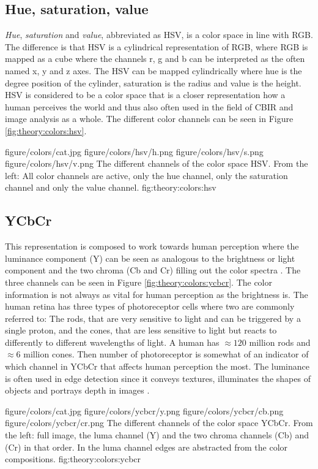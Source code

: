 \subsection{Hue, saturation, value}
\label{sec:HSV_theory}
\emph{Hue}, \emph{saturation} and \emph{value}, abbreviated as HSV, is a color space in line with RGB. The difference is that HSV is a cylindrical representation of RGB, where RGB is mapped as a cube where the channels r, g and b can be interpreted as the often named x, y and z axes. The HSV can be mapped cylindrically where hue is the degree position of the cylinder, saturation is the radius and value is the height. HSV is considered to be a color space that is a closer representation how a human perceives the world and thus also often used in the field of CBIR and image analysis as a whole. The different color channels can be seen in Figure \ref{fig:theory:colors:hsv}.


\fourfigure
{figure/colors/cat.jpg}
{figure/colors/hsv/h.png}
{figure/colors/hsv/s.png}
{figure/colors/hsv/v.png}
{The different channels of the color space HSV. From the left: All color channels are active, only the hue channel, only the saturation channel and only the value channel.}
{fig:theory:colors:hsv} 

\subsection{YCbCr}
\label{sec:ycbcr}
This representation is composed to work towards human perception where the luminance component (Y) can be seen as analogous to the brightness or light component and the two chroma (Cb and Cr) filling out the color spectra \cite{midha2014analysis}. The three channels can be seen in Figure \ref{fig:theory:colors:ycbcr}.
The color information is not always as vital for human perception as the brightness is. The human retina has three types of photoreceptor cells where two are commonly referred to: The rods, that are very sensitive to light and can be triggered by a single proton, and the cones, that are less sensitive to light but reacts to differently to different wavelengths of light. A human has $\approx120$ million rods and $\approx6$ million cones. Then number of photoreceptor is somewhat of an indicator of which channel in YCbCr that affects human perception the most. 
The luminance is often used in edge detection since it conveys textures, illuminates the shapes of objects and portrays depth in images \cite{su2011coldimage}\cite{prajapatiedge}. 

\fourfigure
{figure/colors/cat.jpg}
{figure/colors/ycbcr/y.png}
{figure/colors/ycbcr/cb.png}
{figure/colors/ycbcr/cr.png}
{The different channels of the color space YCbCr. From the left: full image, the luma channel (Y) and the two chroma channels (Cb) and (Cr) in that order. In the luma channel edges are abstracted from the color compositions.}
{fig:theory:colors:ycbcr} 



